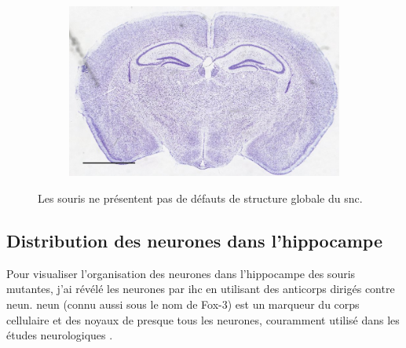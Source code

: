 \begin{figure}[h]
\begin{center}
\begin{subfigure}[h]{0.49\textwidth}
				\end{subfigure}
				\begin{subfigure}[h]{0.49\textwidth}%
					\caption{}
					\label{fig:MaleMutNissl}
					\includegraphics[width=\textwidth]{./Images/Nissl/MaleMut.jpg}
				\end{subfigure}
			\end{center}
			\caption{Les souris \mcrd ne présentent pas de défauts de structure globale du \acrshort{snc}.}
			\label{fig:NisslResultat}
		\end{figure}
		\FloatBarrier

	\subsection{Distribution des neurones dans l'hippocampe}
	\label{ssec:neun}
		Pour visualiser l'organisation des neurones dans l'hippocampe des souris mutantes, j'ai révélé les neurones par \acrshort{ihc} en utilisant des anticorps dirigés contre \acrshort{neun}. \Acrshort{neun} (connu aussi sous le nom de Fox-3) est un marqueur du  corps cellulaire et des noyaux de presque tous les neurones, couramment utilisé dans les études neurologiques \cite{Guselnikova2015, Kim2009}. 
		
